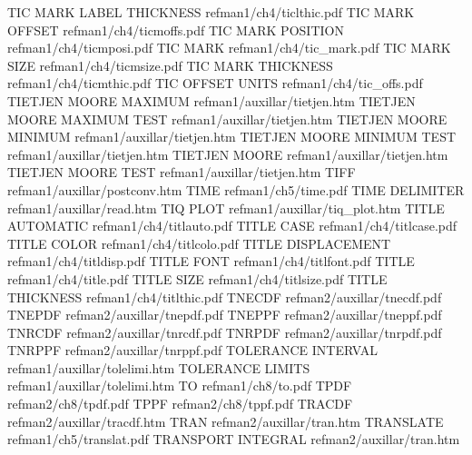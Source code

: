 TIC MARK LABEL THICKNESS                refman1/ch4/ticlthic.pdf
TIC MARK OFFSET                         refman1/ch4/ticmoffs.pdf
TIC MARK POSITION                       refman1/ch4/ticmposi.pdf
TIC MARK                                refman1/ch4/tic_mark.pdf
TIC MARK SIZE                           refman1/ch4/ticmsize.pdf
TIC MARK THICKNESS                      refman1/ch4/ticmthic.pdf
TIC OFFSET UNITS                        refman1/ch4/tic_offs.pdf
TIETJEN MOORE MAXIMUM                   refman1/auxillar/tietjen.htm
TIETJEN MOORE MAXIMUM TEST              refman1/auxillar/tietjen.htm
TIETJEN MOORE MINIMUM                   refman1/auxillar/tietjen.htm
TIETJEN MOORE MINIMUM TEST              refman1/auxillar/tietjen.htm
TIETJEN MOORE                           refman1/auxillar/tietjen.htm
TIETJEN MOORE TEST                      refman1/auxillar/tietjen.htm
TIFF                                    refman1/auxillar/postconv.htm
TIME                                    refman1/ch5/time.pdf
TIME DELIMITER                          refman1/auxillar/read.htm
TIQ PLOT                                refman1/auxillar/tiq_plot.htm
TITLE AUTOMATIC                         refman1/ch4/titlauto.pdf
TITLE CASE                              refman1/ch4/titlcase.pdf
TITLE COLOR                             refman1/ch4/titlcolo.pdf
TITLE DISPLACEMENT                      refman1/ch4/titldisp.pdf
TITLE FONT                              refman1/ch4/titlfont.pdf
TITLE                                   refman1/ch4/title.pdf
TITLE SIZE                              refman1/ch4/titlsize.pdf
TITLE THICKNESS                         refman1/ch4/titlthic.pdf
TNECDF                                  refman2/auxillar/tnecdf.pdf
TNEPDF                                  refman2/auxillar/tnepdf.pdf
TNEPPF                                  refman2/auxillar/tneppf.pdf
TNRCDF                                  refman2/auxillar/tnrcdf.pdf
TNRPDF                                  refman2/auxillar/tnrpdf.pdf
TNRPPF                                  refman2/auxillar/tnrppf.pdf
TOLERANCE INTERVAL                      refman1/auxillar/tolelimi.htm
TOLERANCE LIMITS                        refman1/auxillar/tolelimi.htm
TO                                      refman1/ch8/to.pdf
TPDF                                    refman2/ch8/tpdf.pdf
TPPF                                    refman2/ch8/tppf.pdf
TRACDF                                  refman2/auxillar/tracdf.htm
TRAN                                    refman2/auxillar/tran.htm
TRANSLATE                               refman1/ch5/translat.pdf
TRANSPORT INTEGRAL                      refman2/auxillar/tran.htm
